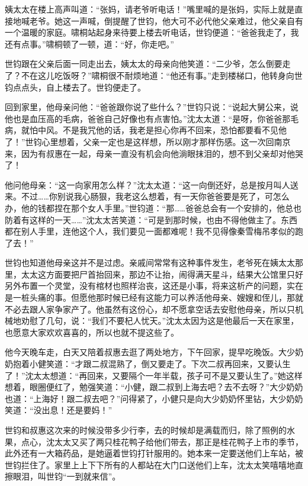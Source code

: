 \par 姨太太在楼上高声叫道：“张妈，请老爷听电话！”嘴里喊的是张妈，实际上就是直接地喊老爷。她这一声喊，倒提醒了世钧，他大可不必代他父亲难过，他父亲自有一个温暖的家庭。啸桐站起身来待要上楼去听电话，世钧便道：“爸爸我走了，我还有点事。”啸桐顿了一顿，道：“好，你走吧。”
\par 世钧跟在父亲后面一同走出去，姨太太的母亲向他笑道：“二少爷，怎么倒要走了？不在这儿吃饭呀？”啸桐很不耐烦地道：“他还有事。”走到楼梯口，他转身向世钧点点头，自上楼去了。世钧便走了。
\par 回到家里，他母亲问他：“爸爸跟你说了些什么？”世钧只说：“说起大舅公来，说他也是血压高的毛病，爸爸自己好像也有点害怕。”沈太太道：“是呀，你爸爸那毛病，就怕中风。不是我咒他的话，我老是担心你再不回来，恐怕都要看不见他了！”世钧心里想着，父亲一定也是这样想，所以刚才那样伤感。这一次回南京来，因为有叔惠在一起，母亲一直没有机会向他淌眼抹泪的，想不到父亲却对他哭了！
\par 他问他母亲：“这一向家用怎么样？”沈太太道：“这一向倒还好，总是按月叫人送来。不过……你别说我心肠狠，我老这么想着，有一天你爸爸要是死了，可怎么办，他的钱都捏在那个女人手里。”世钧道：“那……爸爸总会有一个安排的，他总也防着有这样的一天……”沈太太苦笑道：“可是到那时候，也由不得他做主了。东西都在别人手里，连他这个人，我们要见一面都难呢！我不见得像秦雪梅吊孝似的跑了去！”
\par 世钧也知道他母亲这并不是过虑。亲戚间常常有这种事件发生，老爷死在姨太太那里，太太这方面要把尸首抬回来，那边不让抬，闹得满天星斗，结果大公馆里只好另外布置一个灵堂，没有棺材也照样治丧，这还是小事，将来这析产的问题，实在是一桩头痛的事。但愿他那时候已经有这能力可以养活他母亲、嫂嫂和侄儿，那就不必去跟人家争家产了。他虽然有这份心，却不愿拿空话去安慰他母亲，所以只机械地劝慰了几句，说：“我们不要杞人忧天。”沈太太因为这是他最后一天在家里，也愿意大家欢欢喜喜的，所以也就不提这些了。
\par 他今天晚车走，白天又陪着叔惠去逛了两处地方，下午回家，提早吃晚饭。大少奶奶抱着小健笑道：“才跟二叔混熟了，倒又要走了。下次二叔再回来，又要认生了！”沈太太想道：“再回来，又要隔个一年半载，孩子可不是又要认生了。”她这样想着，眼圈便红了，勉强笑道：“小健，跟二叔到上海去吧？去不去呀？”大少奶奶也道：“上海好！跟二叔去吧？”问得紧了，小健只是向大少奶奶怀里钻，大少奶奶笑道：“没出息！还是要妈！”
\par 世钧和叔惠这次来的时候没带多少行李，去的时候却是满载而归，除了照例的水果，点心，沈太太又买了两只桂花鸭子给他们带去，那正是桂花鸭子上市的季节，此外还有一大箱药品，是她逼着世钧打针服用的。她本来一定要送他们上车站，被世钧拦住了。家里上上下下所有的人都站在大门口送他们上车，沈太太笑嘻嘻地直擦眼泪，叫世钧“一到就来信”。
